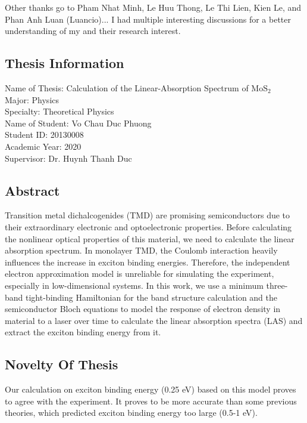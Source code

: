 \documentclass[12pt,english,a4paper]{article}
\begin{document}
	\quad Other thanks go to Pham Nhat Minh, Le Huu Thong, Le Thi Lien, Kien Le, and Phan Anh Luan (Luancio)... I had multiple interesting discussions for a better understanding of my and their research interest.
	\newpage
	\pagestyle{plain}
	\tableofcontents
	\newpage
	\begin{center}
		\listoffigures
		\listoftables
	\end{center}
	\newpage
	\begin{center}
		\section*{Thesis Information}
	\end{center}
\quad Name of Thesis: Calculation of the Linear-Absorption Spectrum of $\mathrm{MoS}_2$\\\null
\quad Major: Physics\\\null
\quad Specialty: Theoretical Physics\\\null
\quad Name of Student: Vo Chau Duc Phuong\\\null
\quad Student ID: 20130008\\\null
\quad Academic Year: 2020\\\null
\quad Supervisor: Dr. Huynh Thanh Duc \\\null
\subsection*{Abstract}
\quad Transition metal dichalcogenides (TMD) are promising semiconductors due to their extraordinary electronic and optoelectronic properties. Before calculating the nonlinear optical properties of this material, we need to calculate the linear absorption spectrum. In monolayer TMD, the Coulomb interaction heavily influences the increase in exciton binding energies. Therefore, the independent electron approximation model is unreliable for simulating the experiment, especially in low-dimensional systems. In this work, we use a minimum three-band tight-binding Hamiltonian for the band structure calculation and the semiconductor Bloch equations to model the response of electron density in material to a laser over time to calculate the linear absorption spectra (LAS) and extract the exciton binding energy from it.
\subsection*{Novelty Of Thesis}
\quad Our calculation on exciton binding energy (0.25 eV) based on this model proves to agree with the experiment. It proves to be more accurate than some previous theories, which predicted exciton binding energy too large (0.5-1 eV).
\end{document}

